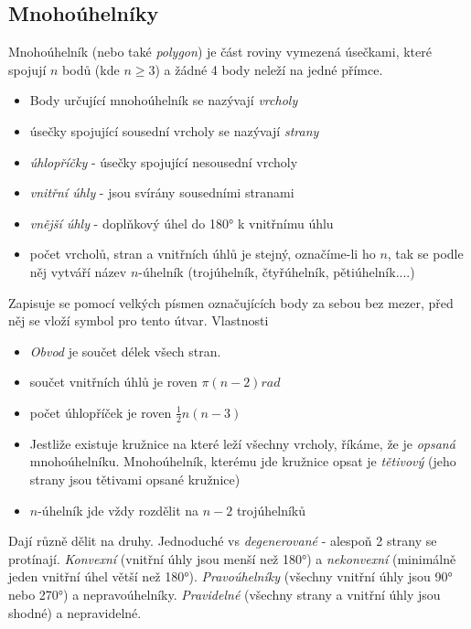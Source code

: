 \documentclass[12pt]{article}
\begin{document}
\subsection{Mnohoúhelníky}
Mnohoúhelník (nebo také \emph{polygon}) je část roviny vymezená úsečkami, které spojují $n$ bodů (kde $n\geq3$) a žádné 4 body neleží na jedné přímce.
\begin{itemize}
\item Body určující mnohoúhelník se nazývají \emph{vrcholy}
\item úsečky spojující sousední vrcholy se nazývají \emph{strany}
\item \emph{úhlopříčky} - úsečky spojující nesousední vrcholy
\item \emph{vnitřní úhly} - jsou svírány sousedními stranami
\item \emph{vnější úhly} - doplňkový úhel do 180° k vnitřnímu úhlu
\item počet vrcholů, stran a vnitřních úhlů je stejný, označíme-li ho $n$, tak se podle něj vytváří název $n$-úhelník (trojúhelník, čtyřúhelník, pětiúhelník....)
\end{itemize}
Zapisuje se pomocí velkých písmen označujících body za sebou bez mezer, před něj se vloží symbol pro tento útvar. Vlastnosti
\begin{itemize}
\item \emph{Obvod} je součet délek všech stran.
\item součet vnitřních úhlů je roven $\pi \left(n-2\right) rad$
\item počet úhlopříček je roven $\frac{1}{2}n(n-3)$
\item Jestliže existuje kružnice na které leží všechny vrcholy, říkáme, že je \emph{opsaná} mnohoúhelníku. Mnohoúhelník, kterému jde kružnice opsat je \emph{tětivový} (jeho strany jsou tětivami opsané kružnice)
\item $n$-úhelník jde vždy rozdělit na $n-2$ trojúhelníků
\end{itemize}
Dají různě dělit na druhy. Jednoduché vs \emph{degenerované} - alespoň 2 strany se protínají. \emph{Konvexní} (vnitřní úhly jsou menší než 180°) a \emph{nekonvexní} (minimálně jeden vnitřní úhel větší než 180°). \emph{Pravoúhelníky} (všechny vnitřní úhly jsou 90° nebo 270°) a nepravoúhelníky. \emph{Pravidelné} (všechny strany a vnitřní úhly jsou shodné) a nepravidelné.\\
\end{document}
